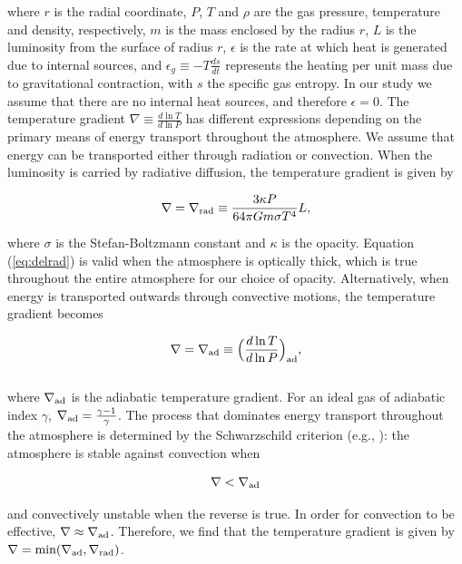 \documentclass[apj]{emulateapj}
\newcommand{\delad}{\nabla_{\rm ad}}
\newcommand{\delrad}{\nabla_{\rm rad}}
\begin{document}
\noindent where $r$ is the radial coordinate, $P$, $T$ and $\rho$ are the gas pressure, temperature and density, respectively, $m$ is the mass enclosed by the radius $r$, $L$ is the luminosity from the surface of radius $r$, $\epsilon$ is the rate at which heat is generated due to internal sources, and $\epsilon_g \equiv -T \frac{ds}{dt}$ represents the heating per unit mass due to gravitational contraction, with $s$ the specific gas entropy. In our study we assume that there are no internal heat sources, and therefore $\epsilon=0$. The temperature gradient $\nabla \equiv \frac{d \ln T}{d \ln P}$ has different expressions depending on the primary means of energy transport throughout the atmosphere. We assume that energy can be transported either through radiation or convection. When the luminosity is carried by radiative diffusion, the temperature gradient is given by

\begin{equation}
\label{eq:delrad}
\nabla = \delrad \equiv \frac{3 \kappa P}{64 \pi G m \sigma T^4} L,
\end{equation}

\noindent where $\sigma$ is the Stefan-Boltzmann constant and $\kappa$ is the opacity. Equation (\ref{eq:delrad}) is valid when the atmosphere is optically thick, which is true throughout the entire atmosphere for our choice of opacity. Alternatively, when energy is transported outwards through convective motions, the temperature gradient becomes


\begin{equation}
\label{eq:delad}
\nabla = \delad \equiv \Big(\frac{d \ln T}{d \ln P}\Big)_{\mathrm{ad}},
\end{equation}
\\

\noindent where $\delad$ is the adiabatic temperature gradient. For an ideal gas of adiabatic index $\gamma$, $\delad=\frac{\gamma-1}{\gamma}$. The process that dominates energy transport throughout the atmosphere is determined by the Schwarzschild criterion (e.g., \citealt{thompson06}): the atmosphere is stable against convection when

\begin{equation}
\label{eq:schwarz}
\nabla < \delad
\end{equation}

\noindent and convectively unstable when the reverse is true. In order for convection to be effective, $\nabla \approx \delad$. Therefore, we find that the temperature gradient is given by $\nabla=\mathrm{min}(\delad, \delrad)$. 
\end{document}
